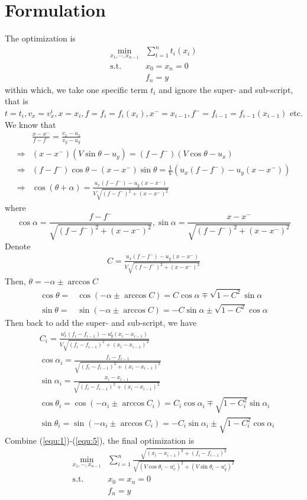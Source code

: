 \documentclass{article}
\begin{document}
\section{Formulation}
The optimization is
\begin{align*}
\min_{x_1,\cdots,x_{n-1}}&\sum_{t=1}^nt_i(x_i)\\\text{s.t.}\ \ &x_0=x_n=0\\&f_n=y
\end{align*}
within which, we take one specific term $t_i$ and ignore the super- and sub-script, that is $t=t_i,v_x=v_x^i,x=x_i,f=f_i=f_i(x_i),x^-=x_{i-1},f^-=f_{i-1}=f_{i-1}(x_{i-1})$ etc. We know that
\begin{align*}
&\frac{x-x^-}{f-f^-}=\frac{v_x-u_x}{v_y-u_y}\\
\Rightarrow&(x-x^-)(V\sin\theta-u_y)=(f-f^-)(V\cos\theta-u_x)\\
\Rightarrow&(f-f^-)\cos\theta-(x-x^-)\sin\theta=\frac{1}{V}(u_x(f-f^-)-u_y(x-x^-))\\
\Rightarrow&\cos(\theta+\alpha)=\frac{u_x(f-f^-)-u_y(x-x^-)}{V\sqrt{(f-f^-)^2+(x-x^-)^2}}
\end{align*}
where
\[
\cos\alpha=\frac{f-f^-}{\sqrt{(f-f^-)^2+(x-x^-)^2}},\sin\alpha=\frac{x-x^-}{\sqrt{(f-f^-)^2+(x-x^-)^2}}
\]
Denote
\begin{align*}
C=\frac{u_x(f-f^-)-u_y(x-x^-)}{V\sqrt{(f-f^-)^2+(x-x^-)^2}}
\end{align*}
Then, $\theta=-\alpha\pm\arccos C$
\begin{align*}
\cos\theta=&\cos(-\alpha\pm\arccos C)=C\cos\alpha\mp\sqrt{1-C^2}\sin\alpha\\
\sin\theta=&\sin(-\alpha\pm\arccos C)=-C\sin\alpha\pm\sqrt{1-C^2}\cos\alpha
\end{align*}
Then back to add the super- and sub-script, we have
\begin{align}
&C_i=\frac{u_x^i(f_i-f_{i-1})-u_y^i(x_i-x_{i-1})}{V\sqrt{(f_i-f_{i-1})^2+(x_i-x_{i-1})^2}}\label{equ:1}\\
&\cos\alpha_i=\frac{f_i-f_{i-1}}{\sqrt{(f_i-f_{i-1})^2+(x_i-x_{i-1})^2}}\label{equ:2}\\
&\sin\alpha_i=\frac{x_i-x_{i-1}}{\sqrt{(f_i-f_{i-1})^2+(x_i-x_{i-1})^2}}\label{equ:3}\\
&\cos\theta_i=\cos(-\alpha_i\pm\arccos C_i)=C_i\cos\alpha_i\mp\sqrt{1-C_i^2}\sin\alpha_i\label{equ:4}\\
&\sin\theta_i=\sin(-\alpha_i\pm\arccos C_i)=-C_i\sin\alpha_i\pm\sqrt{1-C_i^2}\cos\alpha_i\label{equ:5}
\end{align}
Combine (\ref{equ:1})-(\ref{equ:5}), the final optimization is
\begin{align*}
\min_{x_1,\cdots,x_{n-1}}&\sum_{i=1}^n\frac{\sqrt{(x_i-x_{i-1})^2+(f_i-f_{i-1})^2}}{\sqrt{(V\cos\theta_i-u_x^i)^2+(V\sin\theta_i-u_y^i)^2}}\\
\text{s.t.}\ \ &x_0=x_n=0\\&f_n=y
\end{align*}
\end{document}
